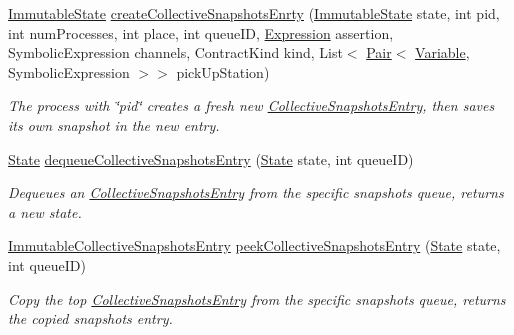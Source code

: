 \begin{DoxyCompactItemize}
\hyperlink{classedu_1_1udel_1_1cis_1_1vsl_1_1civl_1_1state_1_1common_1_1immutable_1_1ImmutableState}{Immutable\+State} \hyperlink{interfaceedu_1_1udel_1_1cis_1_1vsl_1_1civl_1_1state_1_1IF_1_1StateFactory_aaa4576f13147144139eb71f61c506c7b}{create\+Collective\+Snapshots\+Enrty} (\hyperlink{classedu_1_1udel_1_1cis_1_1vsl_1_1civl_1_1state_1_1common_1_1immutable_1_1ImmutableState}{Immutable\+State} state, int pid, int num\+Processes, int place, int queue\+I\+D, \hyperlink{interfaceedu_1_1udel_1_1cis_1_1vsl_1_1civl_1_1model_1_1IF_1_1expression_1_1Expression}{Expression} assertion, Symbolic\+Expression channels, Contract\+Kind kind, List$<$ \hyperlink{classedu_1_1udel_1_1cis_1_1vsl_1_1civl_1_1util_1_1IF_1_1Pair}{Pair}$<$ \hyperlink{interfaceedu_1_1udel_1_1cis_1_1vsl_1_1civl_1_1model_1_1IF_1_1variable_1_1Variable}{Variable}, Symbolic\+Expression $>$$>$ pick\+Up\+Station)
\begin{DoxyCompactList}\small\item\em The process with \char`\"{}pid\char`\"{} creates a fresh new \hyperlink{interfaceedu_1_1udel_1_1cis_1_1vsl_1_1civl_1_1state_1_1IF_1_1CollectiveSnapshotsEntry}{Collective\+Snapshots\+Entry}, then saves its own snapshot in the new entry. \end{DoxyCompactList}\item 
\hyperlink{interfaceedu_1_1udel_1_1cis_1_1vsl_1_1civl_1_1state_1_1IF_1_1State}{State} \hyperlink{interfaceedu_1_1udel_1_1cis_1_1vsl_1_1civl_1_1state_1_1IF_1_1StateFactory_a79263e51d0e37343b1211adb8f1f19f1}{dequeue\+Collective\+Snapshots\+Entry} (\hyperlink{interfaceedu_1_1udel_1_1cis_1_1vsl_1_1civl_1_1state_1_1IF_1_1State}{State} state, int queue\+I\+D)
\begin{DoxyCompactList}\small\item\em Dequeues an \hyperlink{interfaceedu_1_1udel_1_1cis_1_1vsl_1_1civl_1_1state_1_1IF_1_1CollectiveSnapshotsEntry}{Collective\+Snapshots\+Entry} from the specific snapshots queue, returns a new state. \end{DoxyCompactList}\item 
\hyperlink{classedu_1_1udel_1_1cis_1_1vsl_1_1civl_1_1state_1_1common_1_1immutable_1_1ImmutableCollectiveSnapshotsEntry}{Immutable\+Collective\+Snapshots\+Entry} \hyperlink{interfaceedu_1_1udel_1_1cis_1_1vsl_1_1civl_1_1state_1_1IF_1_1StateFactory_a319b79f1cb6f0ca0608b5bccf4a0151c}{peek\+Collective\+Snapshots\+Entry} (\hyperlink{interfaceedu_1_1udel_1_1cis_1_1vsl_1_1civl_1_1state_1_1IF_1_1State}{State} state, int queue\+I\+D)
\begin{DoxyCompactList}\small\item\em Copy the top \hyperlink{interfaceedu_1_1udel_1_1cis_1_1vsl_1_1civl_1_1state_1_1IF_1_1CollectiveSnapshotsEntry}{Collective\+Snapshots\+Entry} from the specific snapshots queue, returns the copied snapshots entry. \end{DoxyCompactList}\item 
$$
\end{DoxyCompactItemize}
